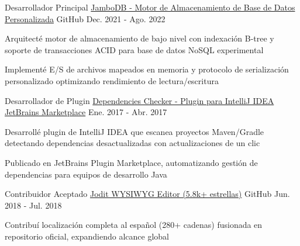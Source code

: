\begin{cventries}
  \cventry
    {Desarrollador Principal} %
    {\href{https://github.com/jambodb/jambodb-storage}{JamboDB - Motor de Almacenamiento de Base de Datos Personalizada}} %
    {\faGithubSquare\acvHeaderIconSep GitHub} %
    {Dec. 2021 - Ago. 2022} %
    {
      \begin{cvitems} %
        \item {Arquitecté motor de almacenamiento de bajo nivel con indexación B-tree y soporte de transacciones ACID para base de datos NoSQL experimental}
        \item {Implementé E/S de archivos mapeados en memoria y protocolo de serialización personalizado optimizando rendimiento de lectura/escritura}
      \end{cvitems}
    }

  \cventry
    {Desarrollador de Plugin} %
    {\href{https://github.com/zp1ke/deps-checker}{Dependencies Checker - Plugin para IntelliJ IDEA}} %
    {\href{https://plugins.jetbrains.com/plugin/9481-java-dependencies-checker}{JetBrains Marketplace}} %
    {Ene. 2017 - Abr. 2017} %
    {
      \begin{cvitems} %
        \item {Desarrollé plugin de IntelliJ IDEA que escanea proyectos Maven/Gradle detectando dependencias desactualizadas con actualizaciones de un clic}
        \item {Publicado en JetBrains Plugin Marketplace, automatizando gestión de dependencias para equipos de desarrollo Java}
      \end{cvitems}
    }

  \cventry
    {Contribuidor Aceptado} %
    {\href{https://github.com/xdan/jodit}{Jodit WYSIWYG Editor (5.8k+ estrellas)}} %
    {\faGithubSquare\acvHeaderIconSep GitHub} %
    {Jun. 2018 - Jul. 2018} %
    {
      \begin{cvitems} %
        \item {Contribuí localización completa al español (280+ cadenas) fusionada en repositorio oficial, expandiendo alcance global}
      \end{cvitems}
    }


\end{cventries}
